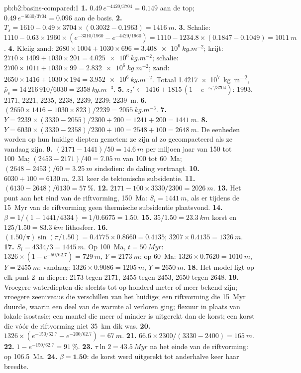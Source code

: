 \begin{solution}{pb:b2:basins-compared:1}
\textbf{1.} $0.49\,e^{-4420/3704} = 0.149$ aan de top; $0.49\,e^{-6030/3704} = 0.096$ aan de basis.
\textbf{2.} $T_s = 1610 - 0.49\times3704\times(0.3032 - 0.1963) = \qty{1416}{m}$.
\textbf{3.} Schalie: $1110 - 0.63\times1960\times(e^{-3310/1960} - e^{-4420/1960}) = 1110 - 1234.8
\times(0.1847 - 0.1049) = \qty{1011}{m}$.
\textbf{4.} Kleiig zand: $2680\times1004 + 1030\times696 = \qty{3.408e6}{kg.m^{-2}}$; krijt:
$2710\times1409 + 1030\times201 = \qty{4.025e6}{kg.m^{-2}}$; schalie: $2700\times1011 + 1030\times99 =
\qty{2.832e6}{kg.m^{-2}}$; zand: $2650\times1416 + 1030\times194 = \qty{3.952e6}{kg.m^{-2}}$. Totaal
\qty{1.4217e7}{kg.m^{-2}}, $\bar\rho_s = 14\,216\,910/6030 = \qty{2358}{kg.m^{-3}}$.
\textbf{5.} $z_2' \leftarrow 1416 + 1815\,(1 - e^{-z_2'/3704})$: 1993, 2171, 2221, 2235, 2238, 2239,
2239: \qty{2239}{m}.
\textbf{6.} $(2650\times1416 + 1030\times823)/2239 = \qty{2055}{kg.m^{-3}}$.
\textbf{7.} $Y = 2239\times(3330 - 2055)/2300 + 200 = 1241 + 200 = \qty{1441}{m}$.
\textbf{8.} $Y = 6030\times(3330 - 2358)/2300 + 100 = 2548 + 100 = \qty{2648}{m}$. De eenheden worden
op hun huidige diepten gemeten: ze zijn al zo gecompacteerd als ze vandaag zijn.
\textbf{9.} $(2171 - 1441)/50 = \qty{14.6}{m}$ per miljoen jaar van 150 tot \qty{100}{Ma};
$(2453 - 2171)/40 = \qty{7.05}{m}$ van 100 tot \qty{60}{Ma}; $(2648 - 2453)/60 = \qty{3.25}{m}$
sindsdien: de daling vertraagt.
\textbf{10.} $6030 + 100 = \qty{6130}{m}$, 2.31 keer de tektonische subsidentie.
\textbf{11.} $(6130 - 2648)/6130 = \qty{57}{\percent}$.
\textbf{12.} $2171 - 100\times3330/2300 = \qty{2026}{m}$.
\textbf{13.} Het punt aan het eind van de riftvorming, \qty{150}{Ma}: $S_i = \qty{1441}{m}$, als er tijdens de
\qty{15}{Myr} van de riftvorming geen thermische subsidentie plaatsvond.
\textbf{14.} $\beta = 1/(1 - 1441/4334) = 1/0.6675 = 1.50$.
\textbf{15.} $35/1.50 = \qty{23.3}{km}$ korst en $125/1.50 = \qty{83.3}{km}$ lithosfeer.
\textbf{16.} $(1.50/\pi)\sin(\pi/1.50) = 0.4775\times0.8660 = 0.4135$; $3207\times0.4135 =
\qty{1326}{m}$.
\textbf{17.} $S_i = 4334/3 = \qty{1445}{m}$. Op \qty{100}{Ma}, $t = \qty{50}{Myr}$: $1326\times(1 -
e^{-50/62.7}) = \qty{729}{m}$, $Y = \qty{2173}{m}$; op \qty{60}{Ma}: $1326\times0.7620 =
\qty{1010}{m}$, $Y = \qty{2455}{m}$; vandaag: $1326\times0.9086 = \qty{1205}{m}$, $Y = \qty{2650}{m}$.
\textbf{18.} Het model ligt op elk punt \qty{2}{m} dieper: 2173 tegen 2171, 2455 tegen 2453,
2650 tegen 2648.
\textbf{19.} Vroegere waterdiepten die slechts tot op honderd meter of meer bekend zijn; vroegere zeeniveaus
die verschillen van het huidige; een riftvorming die \qty{15}{Myr} duurde, waarin een deel van de warmte
al verloren ging; flexuur in plaats van lokale isostasie; een mantel die meer of minder is uitgerekt dan de korst;
een korst die vóór de riftvorming niet \qty{35}{km} dik was.
\textbf{20.} $1326\times(e^{-150/62.7} - e^{-200/62.7}) = \qty{67}{m}$.
\textbf{21.} $66.6\times2300/(3330 - 2400) = \qty{165}{m}$.
\textbf{22.} $1 - e^{-150/62.7} = \qty{91}{\percent}$.
\textbf{23.} $\tau\ln2 = \qty{43.5}{Myr}$ na het einde van de riftvorming: op \qty{106.5}{Ma}.
\textbf{24.} $\beta = \textbf{1.50}$: de korst werd uitgerekt tot anderhalve keer haar breedte.
\end{solution}
